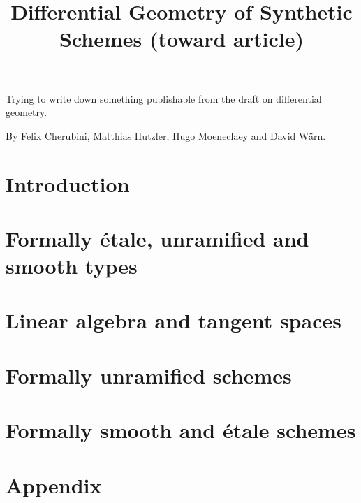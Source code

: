 \documentclass{../util/zariski}
\title{Differential Geometry of Synthetic Schemes (toward article)}
\begin{document}
\maketitle

Trying to write down something publishable from the draft on differential geometry.

By Felix Cherubini, Matthias Hutzler, Hugo Moeneclaey and David Wärn.






\tableofcontents

\section*{Introduction}


\section{Formally étale, unramified and smooth types}


\section{Linear algebra and tangent spaces}


\section{Formally unramified schemes}


\section{Formally smooth and étale schemes}


\pagebreak
\appendix
\section*{Appendix}


\printindex

\printbibliography
\end{document}
